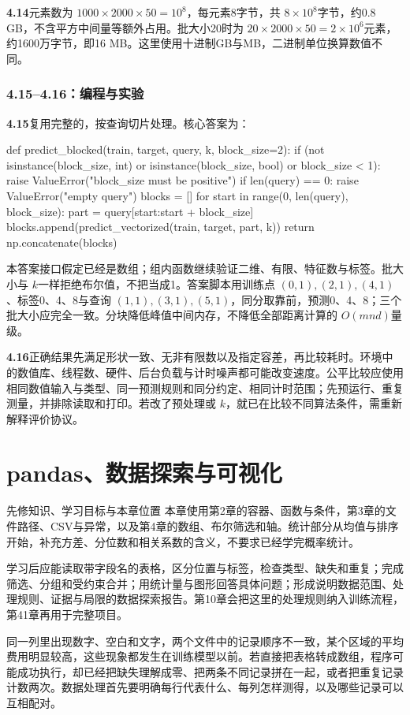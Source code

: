 \documentclass[UTF8,fontset=none,zihao=-4,a4paper]{ctexart}
\newcommand{\chapterpage}[1]{\clearpage\section{#1}}
\newcommand{\code}[1]{\texttt{\detokenize{#1}}}
\numberwithin{equation}{section}
\numberwithin{figure}{section}
\begin{document}
\textbf{4.14}\quad 元素数为 $1000\times2000\times50=10^8$，每元素8字节，共 $8\times10^8$字节，约0.8 GB，不含平方中间量等额外占用。批大小20时为 $20\times2000\times50=2\times10^6$元素，约1600万字节，即16 MB。这里使用十进制GB与MB，二进制单位换算数值不同。

\subsubsection*{4.15--4.16：编程与实验}
\textbf{4.15}\quad 复用完整的\code{predict_vectorized}，按查询切片处理。核心答案为：
\begin{pycode}
def predict_blocked(train, target, query, k, block_size=2):
    if (not isinstance(block_size, int) or isinstance(block_size, bool)
            or block_size < 1):
        raise ValueError("block_size must be positive")
    if len(query) == 0:
        raise ValueError("empty query")
    blocks = []
    for start in range(0, len(query), block_size):
        part = query[start:start + block_size]
        blocks.append(predict_vectorized(train, target, part, k))
    return np.concatenate(blocks)
\end{pycode}
本答案接口假定\code{query}已经是数组；组内函数继续验证二维、有限、特征数与标签。批大小与 $k$一样拒绝布尔值，不把\code{True}当成1。答案脚本用训练点 $(0,1),(2,1),(4,1)$、标签0、4、8与查询 $(1,1),(3,1),(5,1)$，同分取靠前，预测0、4、8；三个批大小应完全一致。分块降低峰值中间内存，不降低全部距离计算的 $O(mnd)$量级。

\textbf{4.16}\quad 正确结果先满足形状一致、无非有限数以及指定容差，再比较耗时。环境中的数值库、线程数、硬件、后台负载与计时噪声都可能改变速度。公平比较应使用相同数值输入与类型、同一预测规则和同分约定、相同计时范围；先预运行、重复测量，并排除读取和打印。若改了预处理或 $k$，就已在比较不同算法条件，需重新解释评价协议。

\chapterpage{pandas、数据探索与可视化}\label{ch:pandas}
\begin{infobox}{先修知识、学习目标与本章位置}
本章使用第2章的容器、函数与条件，第3章的文件路径、CSV与异常，以及第4章的数组、布尔筛选和轴。统计部分从均值与排序开始，补充方差、分位数和相关系数的含义，不要求已经学完概率统计。

学习后应能读取带字段名的表格，区分位置与标签，检查类型、缺失和重复；完成筛选、分组和受约束合并；用统计量与图形回答具体问题；形成说明数据范围、处理规则、证据与局限的数据探索报告。第10章会把这里的处理规则纳入训练流程，第41章再用于完整项目。
\end{infobox}
同一列里出现数字、空白和文字，两个文件中的记录顺序不一致，某个区域的平均费用明显较高，这些现象都发生在训练模型以前。若直接把表格转成数组，程序可能成功执行，却已经把缺失理解成零、把两条不同记录拼在一起，或者把重复记录计数两次。数据处理首先要明确每行代表什么、每列怎样测得，以及哪些记录可以互相配对。
\end{document}
